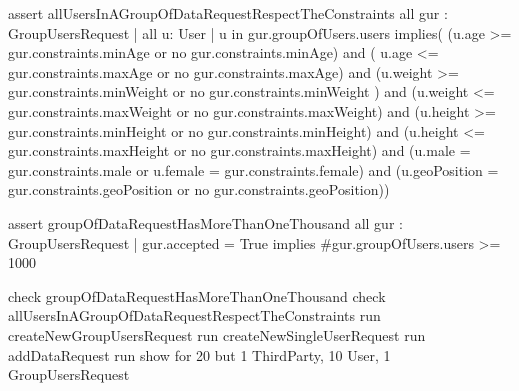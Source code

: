assert allUsersInAGroupOfDataRequestRespectTheConstraints{
	all gur : GroupUsersRequest | all u: User | u in gur.groupOfUsers.users implies( 
	(u.age >= gur.constraints.minAge or no gur.constraints.minAge) and ( u.age <= gur.constraints.maxAge
	or no gur.constraints.maxAge) and (u.weight >= gur.constraints.minWeight or no gur.constraints.minWeight )  and 
	(u.weight <= gur.constraints.maxWeight or no gur.constraints.maxWeight) and (u.height >= gur.constraints.minHeight 
	or no gur.constraints.minHeight) and (u.height <= gur.constraints.maxHeight or no  gur.constraints.maxHeight)  and
	(u.male = gur.constraints.male or u.female = gur.constraints.female) and (u.geoPosition = gur.constraints.geoPosition
	or no  gur.constraints.geoPosition))
}

assert groupOfDataRequestHasMoreThanOneThousand{
	all gur : GroupUsersRequest | gur.accepted = True implies #gur.groupOfUsers.users >= 1000
}

check  groupOfDataRequestHasMoreThanOneThousand
check allUsersInAGroupOfDataRequestRespectTheConstraints
run createNewGroupUsersRequest
run createNewSingleUserRequest
run addDataRequest
run show for 20 but 1 ThirdParty, 10 User, 1 GroupUsersRequest


